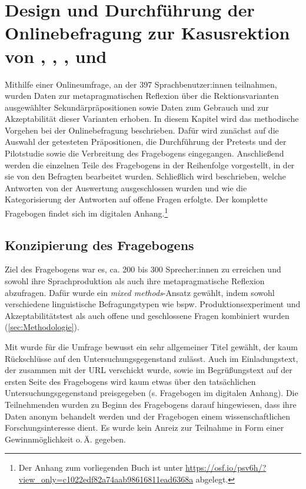 \chapter[Design und Durchführung der Onlinebefragung]{Design und Durchführung der Onlinebefragung zur Kasusrektion von , , ,  und }
\label{cha:Methode}
Mithilfe einer Onlineumfrage, an der 397 Sprachbenutzer:innen teilnahmen, wurden Daten zur metapragmatischen Reflexion über die Rektionsvarianten ausgewählter Sekundärpräpositionen sowie Daten zum Gebrauch und zur Akzeptabilität dieser Varianten erhoben. In diesem Kapitel wird das methodische Vorgehen bei der Onlinebefragung beschrieben. Dafür wird zunächst auf die Auswahl der getesteten Präpositionen, die Durchführung der Pretests und der Pilotstudie sowie die Verbreitung des Fragebogens eingegangen. Anschließend werden die einzelnen Teile des Fragebogens in der Reihenfolge vorgestellt, in der sie von den Befragten bearbeitet wurden. Schließlich wird beschrieben, welche Antworten von der Auswertung ausgeschlossen wurden und wie die Kategorisierung der Antworten auf offene Fragen erfolgte. 
Der komplette Fragebogen findet sich im digitalen Anhang.\footnote{Der Anhang zum vorliegenden Buch ist unter \url{https://osf.io/psv6h/?view_only=c1022edf82a74aab98616811ead6368a} abgelegt.}
\section{Konzipierung des Fragebogens}
\label{sec:Konzipierung}
Ziel des Fragebogens war es, ca. 200 bis 300 Sprecher:innen zu erreichen und sowohl ihre Sprachproduktion als auch ihre metapragmatische Reflexion abzufragen. Dafür wurde ein \textit{mixed methods}-Ansatz gewählt, indem sowohl verschiedene linguistische Befragungstypen wie bspw. Produktionsexperiment und Akzeptabilitätstest als auch offene und geschlossene Fragen kombiniert wurden (\autoref{sec:Methodologie}). 

Mit  wurde für die Umfrage bewusst ein sehr allgemeiner Titel gewählt, der kaum Rückschlüsse auf den Untersuchungsgegenstand zulässt. Auch im Einladungstext, der zusammen mit der URL verschickt wurde, sowie im Begrüßungstext auf der ersten Seite des Fragebogens wird kaum etwas über den tatsächlichen Untersuchungsgegenstand preisgegeben (s. Fragebogen im digitalen Anhang). Die Teilnehmenden wurden zu Beginn des Fragebogens darauf hingewiesen, dass ihre Daten anonym behandelt werden und der Fragebogen einem wissenschaftlichen Forschungsinteresse dient. Es wurde kein Anreiz zur Teilnahme in Form einer Gewinnmöglichkeit o.\,Ä. gegeben. 

